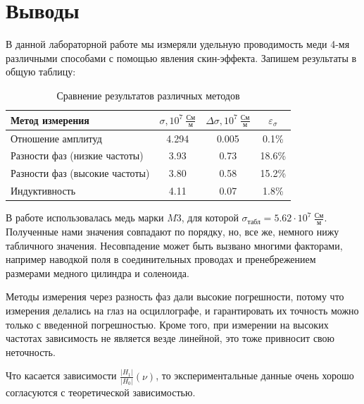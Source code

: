 \documentclass[a4paper, 12pt]{article}
\begin{document}
	\section*{Выводы}
	В данной лабораторной работе мы измеряли удельную проводимость меди 4-мя различными способами с помощью явления скин-эффекта. Запишем результаты в общую таблицу:
	
	\begin{table}[!h]
		\begin{center}
			\begin{tabular}{|l|c|c|c|}
				\hline
				Метод измерения & $\sigma, 10^{7} \ \frac{\text{См}}{\text{м}}$ & $\Delta\sigma, 10^{7} \ \frac{\text{См}}{\text{м}}$ & $\varepsilon_{\sigma}$\\
				\hline
				Отношение амплитуд & 4.294 & 0.005 & 0.1\%\\ \hline
				Разности фаз (низкие частоты) & 3.93 & 0.73 & 18.6\%\\ \hline
				Разности фаз (высокие частоты) & 3.80 & 0.58 & 15.2\%\\ \hline
				Индуктивность & 4.11 & 0.07 & 1.8\%\\ \hline
				
			\end{tabular}
		\end{center}
		\caption{Сравнение результатов различных методов}\label{}
	\end{table}
	
	В работе использовалась медь марки $M3$, для которой $\sigma_{\text{табл}} = 5.62\cdot10^{7} \ \frac{\text{См}}{\text{м}}$.
	Полученные нами значения совпадают по порядку, но, все же, немного нижу табличного значения. Несовпадение может быть вызвано многими факторами, например наводкой поля в соединительных проводах и пренебрежением размерами медного цилиндра и соленоида. 
	
	Методы измерения через разность фаз дали высокие погрешности, потому что измерения делались на глаз на осциллографе, и гарантировать их точность можно только с введенной погрешностью. Кроме того, при измерении на высоких частотах зависимость не является везде линейной, это тоже привносит свою неточность.
	
	Что касается зависимости $\frac{|H_1|}{|H_0|}(\nu)$, то экспериментальные данные очень хорошо согласуются с теоретической зависимостью.
\end{document}
